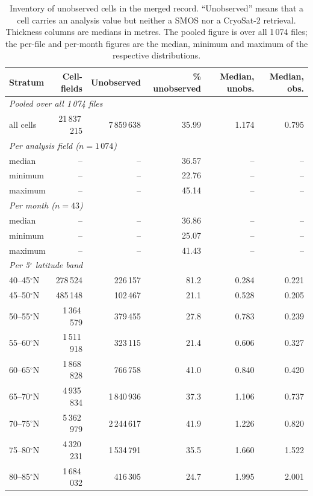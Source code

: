 ﻿\begin{table}[htbp]
\centering
\caption{Inventory of unobserved cells in the merged record. ``Unobserved''
means that a cell carries an analysis value but neither a SMOS nor a CryoSat-2
retrieval. Thickness columns are medians in metres. The pooled figure is over
all 1\,074 files; the per-file and per-month figures are the median, minimum and
maximum of the respective distributions.}
\label{tab:missing}
\footnotesize
\setlength{\tabcolsep}{4pt}
\begin{tabular}{lrrrrr}
\toprule
Stratum & Cell-fields & Unobserved & \% unobserved & Median, unobs. & Median, obs. \\
\midrule
\multicolumn{6}{l}{\textit{Pooled over all 1\,074 files}} \\
all cells & 21\,837\,215 & 7\,859\,638 & 35.99 & 1.174 & 0.795 \\
\midrule
\multicolumn{6}{l}{\textit{Per analysis field ($n=1\,074$)}} \\
median & -- & -- & 36.57 & -- & -- \\
minimum & -- & -- & 22.76 & -- & -- \\
maximum & -- & -- & 45.14 & -- & -- \\
\midrule
\multicolumn{6}{l}{\textit{Per month ($n=43$)}} \\
median & -- & -- & 36.86 & -- & -- \\
minimum & -- & -- & 25.07 & -- & -- \\
maximum & -- & -- & 41.43 & -- & -- \\
\midrule
\multicolumn{6}{l}{\textit{Per 5$^{\circ}$ latitude band}} \\
40--45$^{\circ}$N & 278\,524 & 226\,157 & 81.2 & 0.284 & 0.221 \\
45--50$^{\circ}$N & 485\,148 & 102\,467 & 21.1 & 0.528 & 0.205 \\
50--55$^{\circ}$N & 1\,364\,579 & 379\,455 & 27.8 & 0.783 & 0.239 \\
55--60$^{\circ}$N & 1\,511\,918 & 323\,115 & 21.4 & 0.606 & 0.327 \\
60--65$^{\circ}$N & 1\,868\,828 & 766\,758 & 41.0 & 0.840 & 0.420 \\
65--70$^{\circ}$N & 4\,935\,834 & 1\,840\,936 & 37.3 & 1.106 & 0.737 \\
70--75$^{\circ}$N & 5\,362\,979 & 2\,244\,617 & 41.9 & 1.226 & 0.820 \\
75--80$^{\circ}$N & 4\,320\,231 & 1\,534\,791 & 35.5 & 1.660 & 1.522 \\
80--85$^{\circ}$N & 1\,684\,032 & 416\,305 & 24.7 & 1.995 & 2.001 \\
\bottomrule
\end{tabular}
\end{table}
